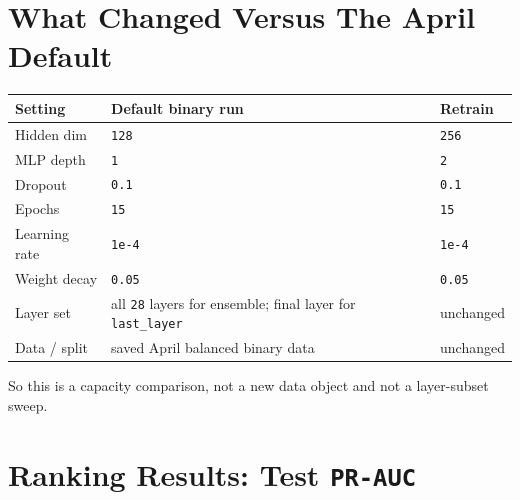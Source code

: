 \documentclass[11pt]{article}
\begin{document}
\section*{What Changed Versus The April Default}
\begin{center}
\small
\setlength{\tabcolsep}{4pt}
\begin{tabular}{@{}lll@{}}
\toprule
Setting & Default binary run & Retrain \\
\midrule
Hidden dim & \texttt{128} & \texttt{256} \\
MLP depth & \texttt{1} & \texttt{2} \\
Dropout & \texttt{0.1} & \texttt{0.1} \\
Epochs & \texttt{15} & \texttt{15} \\
Learning rate & \texttt{1e-4} & \texttt{1e-4} \\
Weight decay & \texttt{0.05} & \texttt{0.05} \\
Layer set & all \texttt{28} layers for ensemble; final layer for \texttt{last\_layer} & unchanged \\
Data / split & saved April balanced binary data & unchanged \\
\bottomrule
\end{tabular}
\end{center}

So this is a capacity comparison, not a new data object and not a layer-subset sweep.

\section*{Ranking Results: Test \texttt{PR-AUC}}
\begin{center}
\small
\setlength{\tabcolsep}{4pt}
\end{center}
\end{document}
